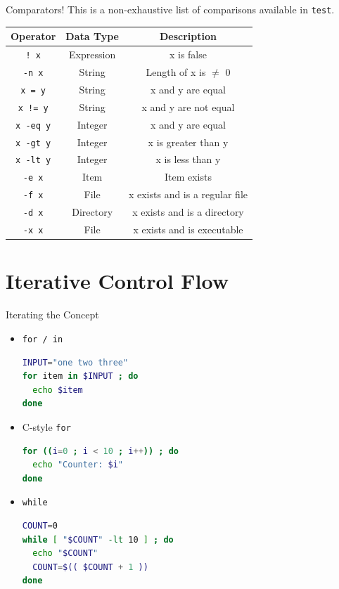 \documentclass[11pt]{beamer}
\begin{document}
\begin{frame}[fragile=singleslide]{Comparators!}
This is a non-exhaustive list of comparisons available in \texttt{test}.
\center
\begin{tabular}{| c | c | c |}
\hline
Operator & Data Type & Description \\ \hline \hline
\texttt{! x} & Expression & x is false \\ \hline \hline
\texttt{-n x} & String & Length of x is $\neq$ 0 \\ \hline
\texttt{x = y} & String & x and y are equal \\ \hline
\texttt{x != y} & String & x and y are not equal \\ \hline \hline
\texttt{x -eq y} & Integer & x and y are equal \\ \hline
\texttt{x -gt y} & Integer & x is greater than y \\ \hline
\texttt{x -lt y} & Integer & x is less than y \\ \hline \hline
\texttt{-e x} & Item & Item exists \\ \hline \hline
\texttt{-f x} & File & x exists and is a regular file \\ \hline
\texttt{-d x} & Directory & x exists and is a directory \\ \hline
\texttt{-x x} & File & x exists and is executable \\ \hline
\end{tabular}

\end{frame}

\section[Loops]{Iterative Control Flow}
\begin{frame}[fragile=singleslide]{Iterating the Concept}
\begin{itemize}
\item \texttt{for / in}
\begin{lstlisting}[style=terminal, language=bash]
INPUT="one two three"
for item in $INPUT ; do
  echo $item
done
\end{lstlisting}
\item C-style \texttt{for}
\begin{lstlisting}[style=terminal, language=bash]
for ((i=0 ; i < 10 ; i++)) ; do
  echo "Counter: $i"
done
\end{lstlisting}
\item \texttt{while}
\begin{lstlisting}[style=terminal, language=bash]
COUNT=0
while [ "$COUNT" -lt 10 ] ; do
  echo "$COUNT"
  COUNT=$(( $COUNT + 1 ))
done
\end{lstlisting}
\end{itemize}
\end{frame}
\end{document}
